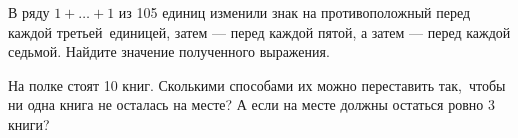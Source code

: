 \documentclass[a4paper,11pt]{article}
\begin{document}

В ряду $1+\ldots+1$ из 105 единиц
изменили знак на противоположный перед каждой третьей~единицей,
затем --- перед каждой пятой, а затем --- перед
каждой седьмой. Найдите значение полученного выражения.

 
На полке стоят 10 книг. Сколькими способами их можно переставить
так,~чтобы ни одна книга не осталась на месте?
 А если на месте должны остаться ровно 3 книги?





\end{document}
